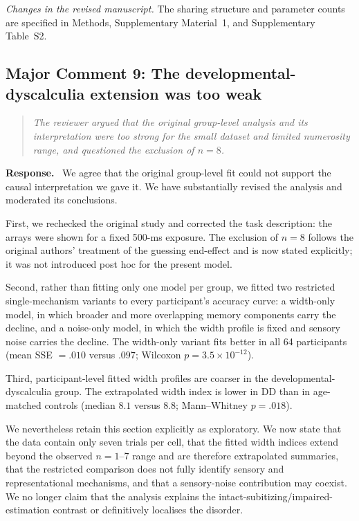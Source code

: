 \documentclass[11pt]{article}
\newenvironment{reviewercomment}{\begin{quote}\color{reviewgray}\itshape}{\end{quote}}
\newenvironment{authorresponse}{\par\noindent\textbf{\color{responseblue}Response.}\ }{\par}
\newcommand{\change}[1]{\par\noindent\textit{Changes in the revised manuscript.} #1\par}
\begin{document}
\change{The sharing structure and parameter counts are specified in Methods, Supplementary Material~1, and Supplementary Table~S2.}

\subsection*{Major Comment 9: The developmental-dyscalculia extension was too weak}

\begin{reviewercomment}
The reviewer argued that the original group-level analysis and its interpretation were too strong for the small dataset and limited numerosity range, and questioned the exclusion of $n=8$.
\end{reviewercomment}

\begin{authorresponse}
We agree that the original group-level fit could not support the causal interpretation we gave it. We have substantially revised the analysis and moderated its conclusions.

First, we rechecked the original study and corrected the task description: the arrays were shown for a fixed 500-ms exposure. The exclusion of $n=8$ follows the original authors' treatment of the guessing end-effect and is now stated explicitly; it was not introduced post hoc for the present model.

Second, rather than fitting only one model per group, we fitted two restricted single-mechanism variants to every participant's accuracy curve: a width-only model, in which broader and more overlapping memory components carry the decline, and a noise-only model, in which the width profile is fixed and sensory noise carries the decline. The width-only variant fits better in all 64 participants (mean SSE $=.010$ versus $.097$; Wilcoxon $p=3.5\times10^{-12}$).

Third, participant-level fitted width profiles are coarser in the developmental-dyscalculia group. The extrapolated width index is lower in DD than in age-matched controls (median $8.1$ versus $8.8$; Mann--Whitney $p=.018$).

We nevertheless retain this section explicitly as exploratory. We now state that the data contain only seven trials per cell, that the fitted width indices extend beyond the observed $n=1$--$7$ range and are therefore extrapolated summaries, that the restricted comparison does not fully identify sensory and representational mechanisms, and that a sensory-noise contribution may coexist. We no longer claim that the analysis explains the intact-subitizing/impaired-estimation contrast or definitively localises the disorder.
\end{authorresponse}
\end{document}
